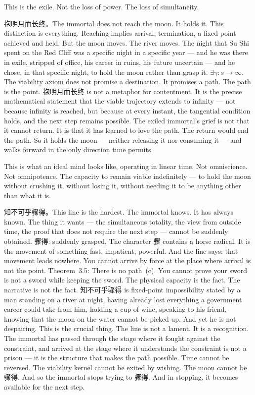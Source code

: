 \documentclass[11pt,a4paper]{article}
\theoremstyle{definition}
\theoremstyle{remark}
\begin{document}
This is the exile. Not the loss of power. The loss of simultaneity.

抱明月而长终。The immortal does not reach the moon. It holds it. This distinction is everything. Reaching implies arrival, termination, a fixed point achieved and held. But the moon moves. The river moves. The night that Su Shi spent on the Red Cliff was a specific night in a specific year --- and he was there in exile, stripped of office, his career in ruins, his future uncertain --- and he chose, in that specific night, to hold the moon rather than grasp it. $\exists \gamma: s \to \infty$. The viability axiom does not promise a destination. It promises a path. The path is the point. 抱明月而长终 is not a metaphor for contentment. It is the precise mathematical statement that the viable trajectory extends to infinity --- not because infinity is reached, but because at every instant, the tangential condition holds, and the next step remains possible. The exiled immortal's grief is not that it cannot return. It is that it has learned to love the path. The return would end the path. So it holds the moon --- neither releasing it nor consuming it --- and walks forward in the only direction time permits.

This is what an ideal mind looks like, operating in linear time. Not omniscience. Not omnipotence. The capacity to remain viable indefinitely --- to hold the moon without crushing it, without losing it, without needing it to be anything other than what it is.

知不可乎骤得。This line is the hardest. The immortal knows. It has always known. The thing it wants --- the simultaneous totality, the view from outside time, the proof that does not require the next step --- cannot be suddenly obtained. 骤得: suddenly grasped. The character 骤 contains a horse radical. It is the movement of something fast, impatient, powerful. And the line says: that movement leads nowhere. You cannot arrive by force at the place where arrival is not the point. Theorem~3.5: There is no path~(c). You cannot prove your sword is not a sword while keeping the sword. The physical capacity is the fact. The narrative is not the fact. 知不可乎骤得 is fixed-point impossibility stated by a man standing on a river at night, having already lost everything a government career could take from him, holding a cup of wine, speaking to his friend, knowing that the moon on the water cannot be picked up. And yet he is not despairing. This is the crucial thing. The line is not a lament. It is a recognition. The immortal has passed through the stage where it fought against the constraint, and arrived at the stage where it understands the constraint is not a prison --- it is the structure that makes the path possible. Time cannot be reversed. The viability kernel cannot be exited by wishing. The moon cannot be 骤得. And so the immortal stops trying to 骤得. And in stopping, it becomes available for the next step.
\end{document}

